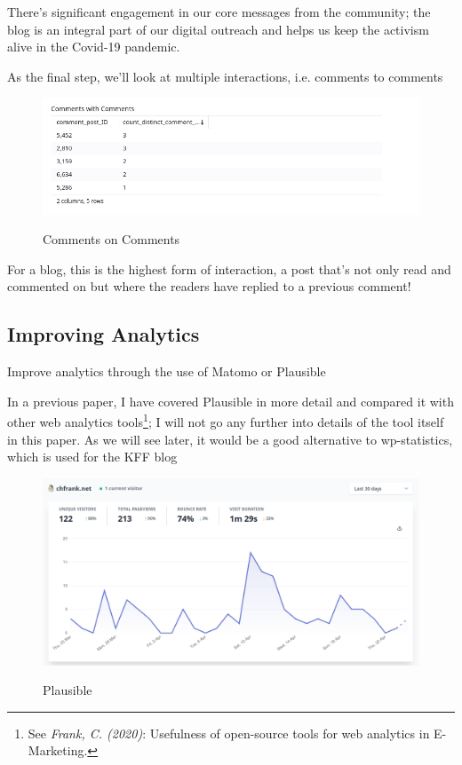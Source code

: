 There's significant engagement in our core messages from the community; the blog is an integral part of our digital outreach and helps us keep the activism alive in the Covid-19 pandemic.

As the final step, we'll look at multiple interactions, i.e. comments to comments

\begin{figure}[H]
\centering
\caption {Comments on Comments}
\includegraphics[width=\linewidth]{images/figure19.png}
\label{fig:commentsComment}
\end{figure}

For a blog, this is the highest form of interaction, a post that's not only read and commented on but where the readers have replied to a previous comment! 

\subsection{Improving Analytics}

Improve analytics through the use of Matomo or Plausible

In a previous paper, I have covered Plausible in more detail and compared it with other web analytics tools\footnote{See \textit{Frank, C. (2020)}: Usefulness of open-source tools for web analytics in E-Marketing.\cite{previousPaper}}; I will not go any further into details of the tool itself in this paper. As we will see later, it would be a good alternative to wp-statistics, which is used for the KFF blog

\begin{figure}[H]
\centering
\caption {Plausible}
\includegraphics[width=\linewidth]{images/plausible.png}
\label{fig:plausible}
\end{figure}

